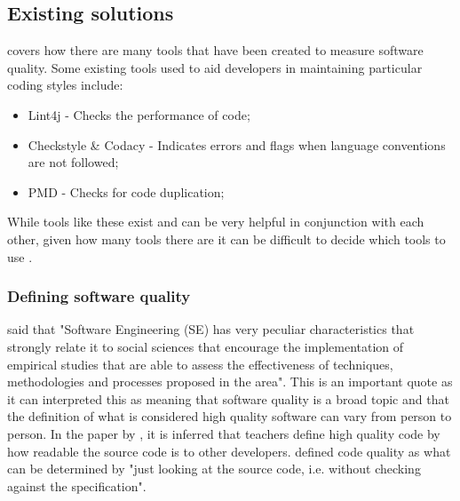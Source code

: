\subsection{Existing solutions}

\cite{8681007} covers how there are many tools that have been created to measure software quality. Some existing tools used to aid developers in maintaining particular coding styles include:
\begin{itemize}
	\item Lint4j - Checks the performance of code;
	\item Checkstyle \& Codacy - Indicates errors and flags when language conventions are not followed;
	\item PMD - Checks for code duplication;
\end{itemize}
While tools like these exist and can be very helpful in conjunction with each other, given how many tools there are it can be difficult to decide which tools to use \citep{6606742}.

\subsubsection{Defining software quality}
\cite{6606742} said that "Software Engineering (SE) has very peculiar characteristics that strongly relate it to social sciences that encourage the implementation of empirical studies that are able to assess the effectiveness of techniques, methodologies and processes proposed in the area". This is an important quote as it can interpreted this as meaning that software quality is a broad topic and that the definition of what is considered high quality software can vary from person to person. In the paper by \cite{10.1145/3428029.3428047}, it is inferred that teachers define high quality code by how readable the source code is to other developers. \cite{10.1145/3428029.3428047, 10.1145/2674683.2674702} defined code quality as what can be determined by "just looking at the source code, i.e. without checking against the specification".
